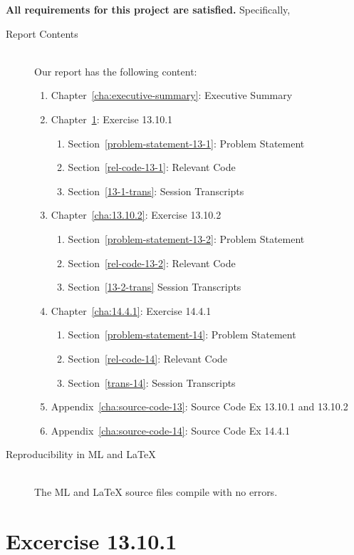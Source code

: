 \documentclass{report}
\begin{document}
\textbf{All requirements for this project are satisfied.}
Specifically,
\begin{description}
\item[Report Contents] \ \\
  Our report has the following content:
  \begin{enumerate}[{}]
  \item Chapter~\ref{cha:executive-summary}: Executive Summary
  \item Chapter~\ref{cha:13.10.1}: Exercise 13.10.1
    \begin{enumerate}[{}]
    \item Section~\ref{problem-statement-13-1}: Problem Statement
    \item Section~\ref{rel-code-13-1}: Relevant Code 
    \item Section~\ref{13-1-trans}: Session Transcripts
    \end{enumerate}
  \item Chapter~\ref{cha:13.10.2}: Exercise 13.10.2
    \begin{enumerate}[{}]
    \item Section~\ref{problem-statement-13-2}: Problem Statement
    \item Section~\ref{rel-code-13-2}: Relevant Code
    \item Section~\ref{13-2-trans} Session Transcripts
    \end{enumerate}
  \item Chapter~\ref{cha:14.4.1}: Exercise 14.4.1
    \begin{enumerate}[{}]
    \item Section~\ref{problem-statement-14}: Problem Statement
    \item Section~\ref{rel-code-14}: Relevant Code
    \item Section~\ref{trans-14}: Session Transcripts
    \end{enumerate}
 \item Appendix~\ref{cha:source-code-13}: Source Code Ex 13.10.1 and 13.10.2
 \item Appendix~\ref{cha:source-code-14}: Source Code Ex 14.4.1
  \end{enumerate}
\item[Reproducibility in ML and \LaTeX{}] \ \\
  The ML and \LaTeX{} source files compile with no errors.
\end{description}



\chapter{Excercise 13.10.1}
\label{cha:13.10.1}
\end{document}
